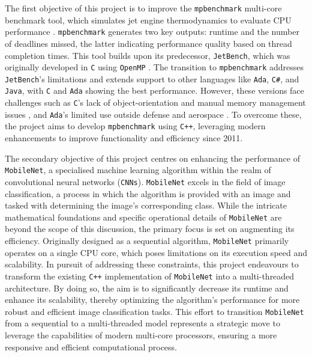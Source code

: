 \documentclass[12pt, openany]{book}
\begin{document}
The first objective of this project is to improve the \texttt{mpbenchmark} multi-core benchmark tool, which simulates jet engine thermodynamics to evaluate CPU performance \cite{mpbenchmark_paper}. \texttt{mpbenchmark} generates two key outputs: runtime and the number of deadlines missed, the latter indicating performance quality based on thread completion times. This tool builds upon its predecessor, \texttt{JetBench}, which was originally developed in \texttt{C} using \texttt{OpenMP} \cite{JetBench_paper}. The transition to \texttt{mpbenchmark} addresses \texttt{JetBench}'s limitations and extends support to other languages like \texttt{Ada}, \texttt{C\#}, and \texttt{Java}, with \texttt{C} and \texttt{Ada} showing the best performance. However, these versions face challenges such as \texttt{C}'s lack of object-orientation and manual memory management issues \cite{c_language_drawbacks}, and \texttt{Ada}'s limited use outside defense and aerospace \cite{ada_langauge_uses}. To overcome these, the project aims to develop \texttt{mpbenchmark} using \texttt{C++}, leveraging modern enhancements to improve functionality and efficiency since 2011.

The secondary objective of this project centres on enhancing the performance of \texttt{MobileNet}, a specialised machine learning algorithm within the realm of convolutional neural networks (\texttt{CNNs})\cite{mobilenet_paper}. \texttt{MobileNet} excels in the field of image classification, a process in which the algorithm is provided with an image and tasked with determining the image's corresponding class. While the intricate mathematical foundations and specific operational details of \texttt{MobileNet} are beyond the scope of this discussion, the primary focus is set on augmenting its efficiency. Originally designed as a sequential algorithm, \texttt{MobileNet} primarily operates on a single CPU core, which poses limitations on its execution speed and scalability. In pursuit of addressing these constraints, this project endeavours to transform the existing \texttt{C++} implementation of \texttt{MobileNet}\cite{mobilenet_repo} into a multi-threaded architecture. By doing so, the aim is to significantly decrease its runtime and enhance its scalability, thereby optimizing the algorithm's performance for more robust and efficient image classification tasks. This effort to transition \texttt{MobileNet} from a sequential to a multi-threaded model represents a strategic move to leverage the capabilities of modern multi-core processors, ensuring a more responsive and efficient computational process.
\end{document}

